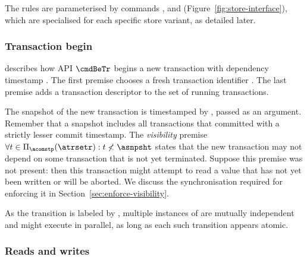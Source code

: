 The rules are parameterised by commands \lookup{}, \doUpdate{} and
\doCommit{} (Figure~\ref{fig:store-interface}), which are specialised
for each specific store variant, as detailed later.



\subsubsection{Transaction begin}

\starttxnrule{} describes how API $\cmdBeTr$ begins a new
transaction with dependency timestamp \asnpsht{}.
The first premise chooses a fresh transaction identifier
\atrans{}.
The last premise adds a transaction descriptor to the set of running
transactions.

The snapshot of the new transaction is timestamped by \asnpsht, passed
as an argument.
Remember that a snapshot includes all transactions that committed with
a strictly lesser commit timestamp.
The \emph{visibility} premise $\forall t \in \Pi_{\acomstp}(\atrsetr): t
\not< \asnpsht$ states that the new transaction may not depend on some
transaction that is not yet terminated.
Suppose this premise was not present: then this transaction might attempt
to read a value that has not yet been written or will be aborted.
We discuss the synchronisation required for enforcing it in
Section~\ref{sec:enforce-visibility}.

As the transition is labeled by \atrans{}, multiple instances of
\starttxnrule{} are mutually independent and might execute in parallel,
as long as each such transition appears atomic.

\subsubsection{Reads and writes}

